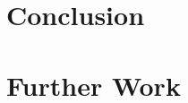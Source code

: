 \documentclass[sigconf]{acmart}
\begin{document}
\section{Conclusion}
\label {sec:conclusion}

%
%

\section{Further Work}
\label{sec:further}



%

\end{document}
